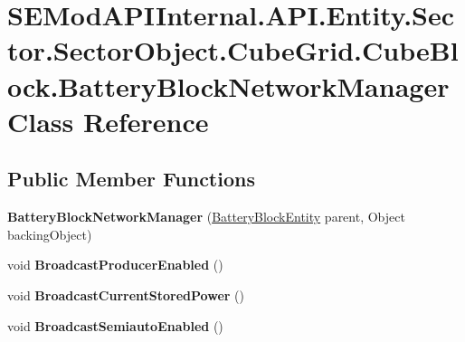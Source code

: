\hypertarget{class_s_e_mod_a_p_i_internal_1_1_a_p_i_1_1_entity_1_1_sector_1_1_sector_object_1_1_cube_grid_1_1d727a14220007a281c99a2418d07055f}{}\section{S\+E\+Mod\+A\+P\+I\+Internal.\+A\+P\+I.\+Entity.\+Sector.\+Sector\+Object.\+Cube\+Grid.\+Cube\+Block.\+Battery\+Block\+Network\+Manager Class Reference}
\label{class_s_e_mod_a_p_i_internal_1_1_a_p_i_1_1_entity_1_1_sector_1_1_sector_object_1_1_cube_grid_1_1d727a14220007a281c99a2418d07055f}
\subsection*{Public Member Functions}
\begin{DoxyCompactItemize}
\item 
\hypertarget{class_s_e_mod_a_p_i_internal_1_1_a_p_i_1_1_entity_1_1_sector_1_1_sector_object_1_1_cube_grid_1_1d727a14220007a281c99a2418d07055f_a5b829e53c768e109d3d0e3030a49de13}{}{\bfseries Battery\+Block\+Network\+Manager} (\hyperlink{class_s_e_mod_a_p_i_internal_1_1_a_p_i_1_1_entity_1_1_sector_1_1_sector_object_1_1_cube_grid_1_1e3ae28049e4cb2ea762f188fbd81d368}{Battery\+Block\+Entity} parent, Object backing\+Object)\label{class_s_e_mod_a_p_i_internal_1_1_a_p_i_1_1_entity_1_1_sector_1_1_sector_object_1_1_cube_grid_1_1d727a14220007a281c99a2418d07055f_a5b829e53c768e109d3d0e3030a49de13}

\item 
\hypertarget{class_s_e_mod_a_p_i_internal_1_1_a_p_i_1_1_entity_1_1_sector_1_1_sector_object_1_1_cube_grid_1_1d727a14220007a281c99a2418d07055f_a6ded8a150cbfce57852a86f39c768daa}{}void {\bfseries Broadcast\+Producer\+Enabled} ()\label{class_s_e_mod_a_p_i_internal_1_1_a_p_i_1_1_entity_1_1_sector_1_1_sector_object_1_1_cube_grid_1_1d727a14220007a281c99a2418d07055f_a6ded8a150cbfce57852a86f39c768daa}

\item 
\hypertarget{class_s_e_mod_a_p_i_internal_1_1_a_p_i_1_1_entity_1_1_sector_1_1_sector_object_1_1_cube_grid_1_1d727a14220007a281c99a2418d07055f_a079bb65a1b27cef629a0d410a90de093}{}void {\bfseries Broadcast\+Current\+Stored\+Power} ()\label{class_s_e_mod_a_p_i_internal_1_1_a_p_i_1_1_entity_1_1_sector_1_1_sector_object_1_1_cube_grid_1_1d727a14220007a281c99a2418d07055f_a079bb65a1b27cef629a0d410a90de093}

\item 
\hypertarget{class_s_e_mod_a_p_i_internal_1_1_a_p_i_1_1_entity_1_1_sector_1_1_sector_object_1_1_cube_grid_1_1d727a14220007a281c99a2418d07055f_a3012bbfa37c54b71e3bb65223ff6a25c}{}void {\bfseries Broadcast\+Semiauto\+Enabled} ()\label{class_s_e_mod_a_p_i_internal_1_1_a_p_i_1_1_entity_1_1_sector_1_1_sector_object_1_1_cube_grid_1_1d727a14220007a281c99a2418d07055f_a3012bbfa37c54b71e3bb65223ff6a25c}

\end{DoxyCompactItemize}
